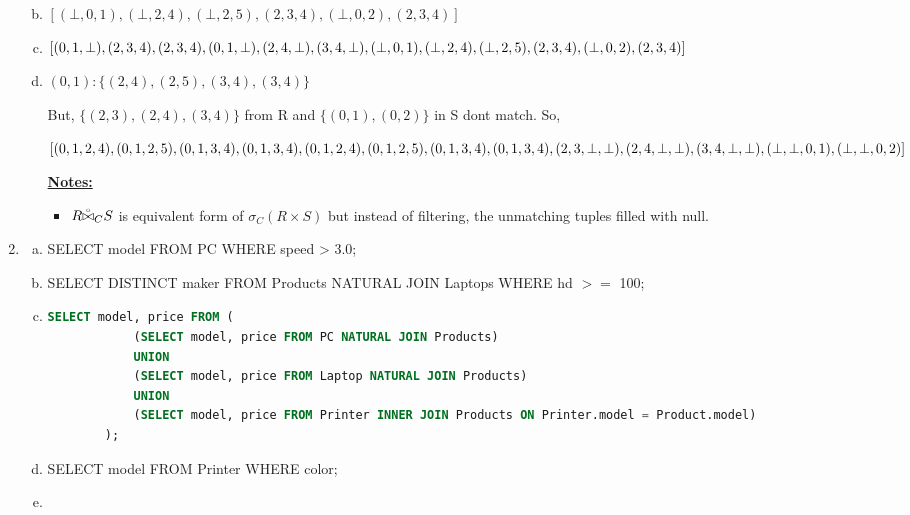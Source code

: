 \documentclass[12pt]{article}
\begin{document}
\begin{enumerate}[1.]
\begin{enumerate}[a)]
\begin{itemize}
        \end{itemize}

        \item $[(\bot,0,1),(\bot,2,4), (\bot,2,5),(2,3,4),(\bot,0,2),(2,3,4)]$
        \item $[(0,1,\bot),(2,3,4), (2,3,4),(0,1,\bot),(2,4,\bot),(3,4,\bot),\\
                (\bot,0,1),(\bot,2,4), (\bot,2,5),(2,3,4),(\bot,0,2),(2,3,4)]$

        \item

        $(0,1): \{(2,4),(2,5),(3,4),(3,4)\}$

        \bigskip


        But, $\{(2,3),(2,4),(3,4)\}$ from R and $\{(0,1),(0,2)\}$ in S dont match. So,

        \bigskip

        $[(0,1,2,4),(0,1,2,5),(0,1,3,4),(0,1,3,4),(0,1,2,4),(0,1,2,5),(0,1,3,4),(0,1,3,4),\\
         (2,3,\bot,\bot),(2,4,\bot,\bot),(3,4,\bot,\bot),(\bot,\bot,0,1),(\bot,\bot,0,2)]$

        \bigskip

        \underline{\textbf{Notes:}}

        \bigskip

        \begin{itemize}
            \item $R\accentset{\circ}{\bowtie}_CS$ is equivalent form of $\sigma_C({R \times S})$ but instead
            of filtering, the unmatching tuples filled with null.
        \end{itemize}
    \end{enumerate}

    \item

    \begin{enumerate}[a)]
        \item SELECT model FROM PC WHERE speed > 3.0;
        \item SELECT DISTINCT maker FROM Products NATURAL JOIN Laptops
        WHERE hd $>=$ 100;
        \item

        \begin{lstlisting}[language=SQL]
        SELECT model, price FROM (
            (SELECT model, price FROM PC NATURAL JOIN Products)
            UNION
            (SELECT model, price FROM Laptop NATURAL JOIN Products)
            UNION
            (SELECT model, price FROM Printer INNER JOIN Products ON Printer.model = Product.model)
        );
        \end{lstlisting}
        \item SELECT model FROM Printer WHERE color;
        \item


\end{enumerate}
\end{enumerate}
\end{document}
